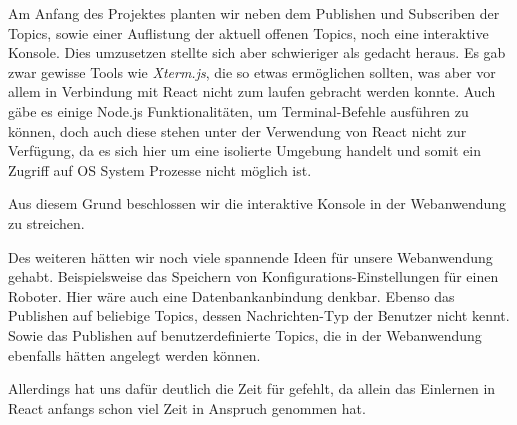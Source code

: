 \begin{flushleft}
    Am Anfang des Projektes planten wir neben dem Publishen und Subscriben der Topics, sowie einer Auflistung der aktuell offenen Topics, noch eine interaktive Konsole.
    Dies umzusetzen stellte sich aber schwieriger als gedacht heraus. 
    Es gab zwar gewisse Tools wie \textit{Xterm.js}, die so etwas ermöglichen sollten, was aber vor allem in Verbindung mit React nicht zum laufen gebracht werden konnte.
    Auch gäbe es einige Node.js Funktionalitäten, um Terminal-Befehle ausführen zu können, doch auch diese stehen unter der Verwendung von React nicht zur Verfügung, da es sich hier um eine isolierte Umgebung handelt und somit ein Zugriff auf OS System Prozesse nicht möglich ist.

    Aus diesem Grund beschlossen wir die interaktive Konsole in der Webanwendung zu streichen.

    Des weiteren hätten wir noch viele spannende Ideen für unsere Webanwendung gehabt.
    Beispielsweise das Speichern von Konfigurations-Einstellungen für einen Roboter.
    Hier wäre auch eine Datenbankanbindung denkbar.
    Ebenso das Publishen auf beliebige Topics, dessen Nachrichten-Typ der Benutzer nicht kennt.
    Sowie das Publishen auf benutzerdefinierte Topics, die in der Webanwendung ebenfalls hätten angelegt werden können.
    
    Allerdings hat uns dafür deutlich die Zeit für gefehlt, da allein das Einlernen in React anfangs schon viel Zeit in Anspruch genommen hat.
\end{flushleft}